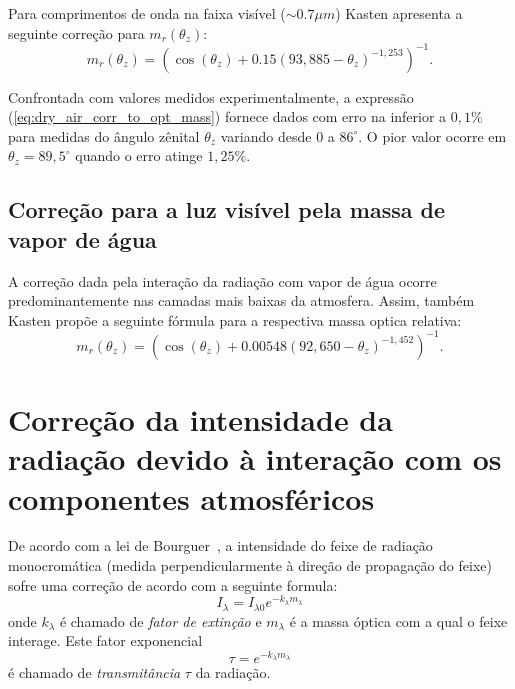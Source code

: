 \documentclass[12pt,a4paper]{article}
\begin{document}
	Para comprimentos de onda na faixa visível ($\sim 0.7\mu m$) Kasten 
	apresenta a seguinte correção para $m_r (\theta_z)$:
	\begin{equation}
		m_r (\theta_z) = {\left(\cos(\theta_z) + 0.15{(93,885-\theta_z)}^{-1,253}\right)}^{-1}. \label{eq:dry_air_corr_to_opt_mass}
	\end{equation}

	Confrontada com valores medidos experimentalmente, a expressão
	(\ref{eq:dry_air_corr_to_opt_mass}) fornece dados com erro na
	inferior a $0,1\%$ para medidas do ângulo zênital $\theta_z$ variando desde $0$ a
	$86^{\circ}$. O pior valor ocorre em $\theta_z = 89,5^{\circ}$ quando o
	erro atinge $1,25\%$.

	\subsection{Correção para a luz visível pela massa de vapor de água }

	A correção dada pela interação da radiação com vapor de água
	ocorre predominantemente nas camadas mais baixas da atmosfera.
	Assim, também Kasten propõe a seguinte fórmula para a respectiva
	massa optica relativa:
	\begin{equation}
		m_r (\theta_z) = {\left(\cos(\theta_z) + 0.00548{(92,650-\theta_z)}^{-1,452}\right)}^{-1}. \label{eq:w_vapor_corr_to_opt_mass}
	\end{equation}

	\section{Correção da intensidade da radiação devido à interação com os componentes atmosféricos}

	De acordo com a lei de Bourguer~\cite{muhamad_iqbal}, a intensidade do 
	feixe de radiação monocromática (medida perpendicularmente à direção de
	propagação do feixe) sofre uma correção de acordo com a seguinte formula:
	\begin{equation}
		I_{\lambda} = I_{\lambda 0}e^{-k_{\lambda}m_{\lambda}} \label{eq:bourguers_law}
	\end{equation}
	onde $k_\lambda$ é chamado de \emph{fator de extinção} e $m_\lambda$ é a
	massa óptica com a qual o feixe interage. Este fator exponencial 
	\begin{equation}
		\tau = e^{-k_{\lambda}m_{\lambda}}
	\end{equation}é chamado de \emph{transmitância} $\tau$ da radiação.
\end{document}
